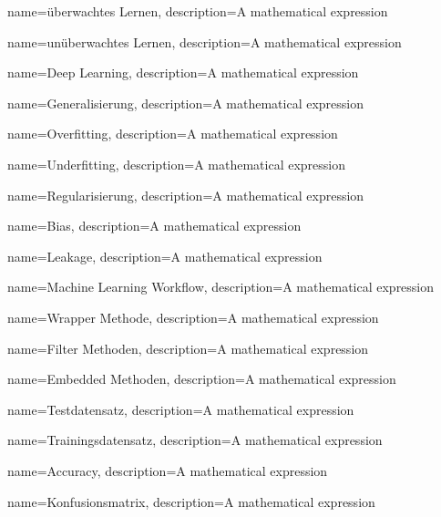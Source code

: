 {
        name=überwachtes Lernen,
        description={A mathematical expression}
}

{
        name=unüberwachtes Lernen,
        description={A mathematical expression}
}

{
        name=Deep Learning,
        description={A mathematical expression}
}

{
        name=Generalisierung,
        description={A mathematical expression}
}

{
        name=Overfitting,
        description={A mathematical expression}
}

{
        name=Underfitting,
        description={A mathematical expression}
}

{
        name=Regularisierung,
        description={A mathematical expression}
}

{
        name=Bias,
        description={A mathematical expression}
}

{
        name=Leakage,
        description={A mathematical expression}
}

{
        name=Machine Learning Workflow,
        description={A mathematical expression}
}

{
        name=Wrapper Methode,
        description={A mathematical expression}
}

{
        name=Filter Methoden,
        description={A mathematical expression}
}

{
        name=Embedded Methoden,
        description={A mathematical expression}
}

{
        name=Testdatensatz,
        description={A mathematical expression}
}

{
        name=Trainingsdatensatz,
        description={A mathematical expression}
}

{
        name=Accuracy,
        description={A mathematical expression}
}

{
        name=Konfusionsmatrix,
        description={A mathematical expression}
}

